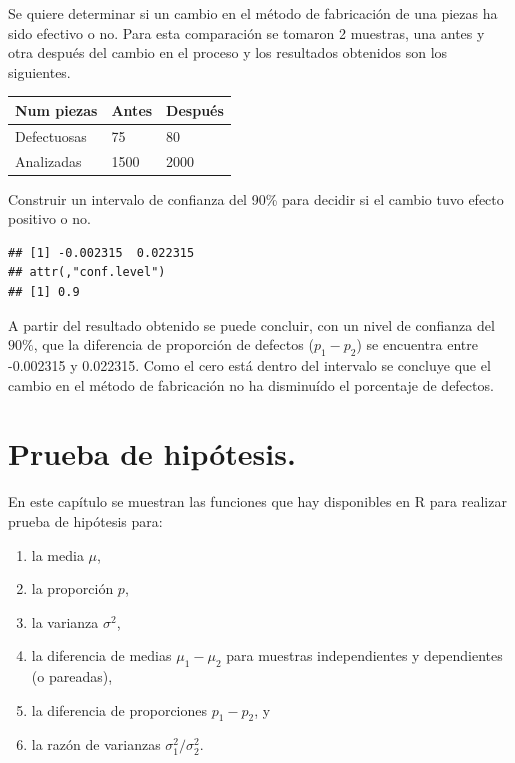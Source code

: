 \documentclass[10pt,]{krantz}
\makeatletter
\newenvironment{Shaded}{\begin{snugshade}}{\end{snugshade}}
\newcommand{\KeywordTok}[1]{\textcolor[rgb]{0.13,0.29,0.53}{\textbf{{#1}}}}
\newcommand{\DataTypeTok}[1]{\textcolor[rgb]{0.13,0.29,0.53}{{#1}}}
\newcommand{\DecValTok}[1]{\textcolor[rgb]{0.00,0.00,0.81}{{#1}}}
\newcommand{\FloatTok}[1]{\textcolor[rgb]{0.00,0.00,0.81}{{#1}}}
\newcommand{\NormalTok}[1]{{#1}}
\providecommand{\tightlist}{%
  \setlength{\itemsep}{0pt}\setlength{\parskip}{0pt}}
\let\proglang=\textsf
\newenvironment{kframe}{%
\medskip{}
\setlength{\fboxsep}{.8em}
 \def\at@end@of@kframe{}%
 \ifinner\ifhmode%
  \def\at@end@of@kframe{\end{minipage}}%
  \begin{minipage}{\columnwidth}%
 \fi\fi%
 \def\FrameCommand##1{\hskip\@totalleftmargin \hskip-\fboxsep
 \colorbox{shadecolor}{##1}\hskip-\fboxsep
     \hskip-\linewidth \hskip-\@totalleftmargin \hskip\columnwidth}%
 \MakeFramed {\advance\hsize-\width
   \@totalleftmargin\z@ \linewidth\hsize
   \@setminipage}}%
 {\par\unskip\endMakeFramed%
 \at@end@of@kframe}
\renewenvironment{Shaded}{\begin{kframe}}{\end{kframe}}
\makeatother
\begin{document}
Se quiere determinar si un cambio en el método de fabricación de una
piezas ha sido efectivo o no. Para esta comparación se tomaron 2
muestras, una antes y otra después del cambio en el proceso y los
resultados obtenidos son los siguientes.

\begin{longtable}[]{@{}lll@{}}
\toprule
Num piezas & Antes & Después\tabularnewline
\midrule
\endhead
Defectuosas & 75 & 80\tabularnewline
Analizadas & 1500 & 2000\tabularnewline
\bottomrule
\end{longtable}

Construir un intervalo de confianza del 90\% para decidir si el cambio
tuvo efecto positivo o no.

\begin{Shaded}
\end{Shaded}

\begin{verbatim}
## [1] -0.002315  0.022315
## attr(,"conf.level")
## [1] 0.9
\end{verbatim}

A partir del resultado obtenido se puede concluir, con un nivel de
confianza del \(90\%\), que la diferencia de proporción de defectos
(\(p_1 - p_2\)) se encuentra entre -0.002315 y 0.022315. Como el cero
está dentro del intervalo se concluye que el cambio en el método de
fabricación no ha disminuído el porcentaje de defectos.

\chapter{\texorpdfstring{Prueba de hipótesis.
}{Prueba de hipótesis. }}\label{prueba-de-hipotesis.}

En este capítulo se muestran las funciones que hay disponibles en
\proglang{R} para realizar prueba de hipótesis para:

\begin{enumerate}
\def\labelenumi{\arabic{enumi}.}
\tightlist
\item
  la media \(\mu\),
\item
  la proporción \(p\),
\item
  la varianza \(\sigma^2\),
\item
  la diferencia de medias \(\mu_1-\mu_2\) para muestras independientes y
  dependientes (o pareadas),
\item
  la diferencia de proporciones \(p_1 - p_2\), y
\item
  la razón de varianzas \(\sigma_1^2 / \sigma_2^2\).
\end{enumerate}
\end{document}
